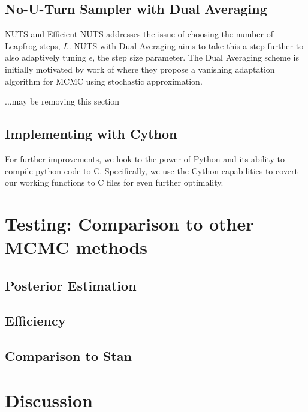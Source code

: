 \documentclass[12pt]{article}
\begin{document}
\subsection{No-U-Turn Sampler with Dual Averaging}
NUTS and Efficient NUTS addresses the issue of choosing the number of Leapfrog steps, $L$. NUTS with Dual Averaging aims to take this a step further to also adaptively tuning $\epsilon$, the step size parameter. The Dual Averaging scheme is initially motivated by work of \cite{robbins} where they propose a vanishing adaptation algorithm for MCMC using stochastic approximation. 

...may be removing this section

\subsection{Implementing with Cython}
For further improvements, we look to the power of Python and its ability to compile python code to C. Specifically, we use the Cython capabilities to covert our working functions to C files for even further optimality. 

\section{Testing: Comparison to other MCMC methods}
\subsection{Posterior Estimation} 
\subsection{Efficiency}
\subsection{Comparison to Stan}

\section{Discussion}
\end{document}
